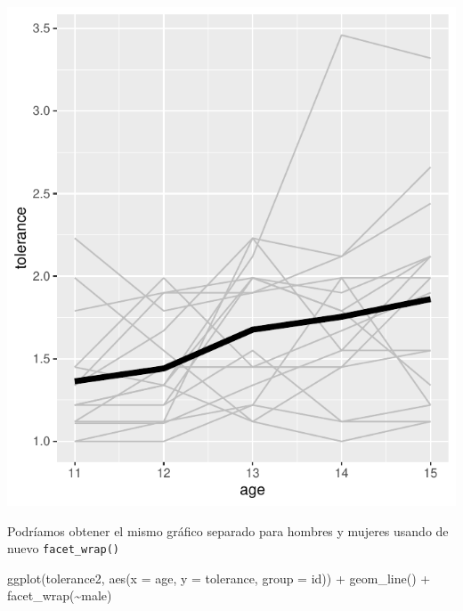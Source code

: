 \documentclass[
]{book}
\newenvironment{Shaded}{\begin{snugshade}}{\end{snugshade}}
\newcommand{\AttributeTok}[1]{\textcolor[rgb]{0.77,0.63,0.00}{#1}}
\newcommand{\FunctionTok}[1]{\textcolor[rgb]{0.00,0.00,0.00}{#1}}
\newcommand{\NormalTok}[1]{#1}
\newcommand{\SpecialCharTok}[1]{\textcolor[rgb]{0.00,0.00,0.00}{#1}}
\begin{document}
\includegraphics{fig_out/unnamed-chunk-40-1.pdf}

Podríamos obtener el mismo gráfico separado para hombres y mujeres usando de nuevo \texttt{facet\_wrap()}

\begin{Shaded}
\begin{Highlighting}[]
\FunctionTok{ggplot}\NormalTok{(tolerance2, }\FunctionTok{aes}\NormalTok{(}\AttributeTok{x =}\NormalTok{ age, }\AttributeTok{y =}\NormalTok{ tolerance, }\AttributeTok{group =}\NormalTok{ id)) }\SpecialCharTok{+}
  \FunctionTok{geom\_line}\NormalTok{() }\SpecialCharTok{+}
  \FunctionTok{facet\_wrap}\NormalTok{(}\SpecialCharTok{\textasciitilde{}}\NormalTok{male)}
\end{Highlighting}
\end{Shaded}
\end{document}
